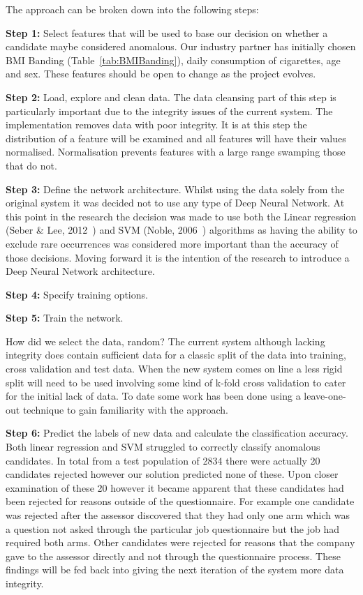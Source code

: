\par
\noindent
The approach can be broken down into the following steps:

\textbf{Step 1:} Select features that will be used to base our decision on whether a candidate maybe considered anomalous. Our industry partner has initially chosen BMI Banding (Table~\ref{tab:BMIBanding}), daily consumption of cigarettes, age and sex. These features should be open to change as the project evolves.



\textbf{Step 2:} Load, explore and clean data. The data cleansing part of this step is particularly important due to the integrity issues of the current system. The implementation removes data with poor integrity. It is at this step the distribution of a feature will be examined and all features will have their values normalised. Normalisation prevents features with a large range swamping those that do not.

\textbf{Step 3:} Define the network architecture. Whilst using the data solely from the original system it was decided not to use any type of Deep Neural Network. At this point in the research the decision was made to use both the Linear regression (Seber \& Lee, 2012~\cite{seber2012linear}) and SVM (Noble, 2006~\cite{noble2006support}) algorithms as having the ability to exclude rare occurrences was considered more important than the accuracy of those decisions. Moving forward it is the intention of the research to introduce a Deep Neural Network architecture.


\textbf{Step 4:} Specify training options.

\textbf{Step 5:} Train the network.

How did we select the data, random?
The current system although lacking integrity does contain sufficient data for a classic split of the data into training, cross validation and test data. When the new system comes on line a less rigid split will need to be used involving some kind of k-fold cross validation to cater for the initial lack of data. To date some work has been done using a leave-one-out technique to gain familiarity with the approach.

\textbf{Step 6:} Predict the labels of new data and calculate the classification accuracy. Both linear regression and SVM struggled to correctly classify anomalous candidates. In total from a test population of 2834 there were actually 20 candidates rejected however our solution predicted none of these. Upon closer examination of these 20 however it became apparent that these candidates had been rejected for reasons outside of the questionnaire. For example one candidate was rejected after the assessor discovered that they had only one arm which was a question not asked through the particular job questionnaire but the job had required both arms. Other candidates were rejected for reasons that the company gave to the assessor directly and not through the questionnaire process. These findings will be fed back into giving the next iteration of the system more data integrity.


